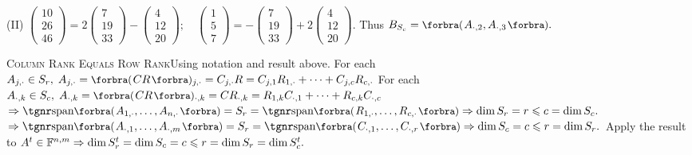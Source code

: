 (II) {\normalsize$\begin{pmatrix} 10\\[-2pt] 26\\[-2pt] 46\end{pmatrix}=2\begin{pmatrix} 7\\[-2pt] 19\\[-2pt] 33\end{pmatrix}-\begin{pmatrix} 4\\[-2pt] 12\\[-2pt] 20\end{pmatrix}; \quad \begin{pmatrix} 1\\[-2pt] 5\\[-2pt] 7\end{pmatrix}=-\begin{pmatrix} 7\\[-2pt] 19\\[-2pt] 33\end{pmatrix}+2\begin{pmatrix} 4\\[-2pt] 12\\[-2pt] 20\end{pmatrix}$}. \;Thus $B_{S_c}=\BigPar{A_{\cdot,2},A_{\cdot,3}}.$\vspace{6pt}\par
\SepLine

\BulletPointX\textsc{Column Rank Equals Row Rank}\quad Using notation and result above.\TextB{}
For each $A_{j,\cdot}\in S_r,\;A_{j,\cdot}=\BigPar{CR}{_{j,\cdot}}=C_{j,\cdot}R=C_{j,1}R_{1,\cdot}+\dots+C_{j,c}R_{c,\cdot}$\TextB{}
For each $A_{\cdot,k}\in S_c,\;A_{\cdot,k}=\BigPar{CR}{_{\cdot,k}}=CR_{\cdot,k}=R_{1,k}C_{\cdot,1}+\dots+R_{c,k}C_{\cdot,c}$\TextB{}
$\Rightarrow\Span[\BigPar]{A_{1,\cdot},\dots,A_{n,\cdot}}=S_r=\Span[\BigPar]{R_{1,\cdot},\dots,R_{c,\cdot}}\Rightarrow\dim S_r=r\leqslant c=\dim S_c.$\TextB{}
$\Rightarrow\Span[\BigPar]{A_{\cdot,1},\dots,A_{\cdot,m}}=S_r=\Span[\BigPar]{C_{\cdot,1},\dots,C_{\cdot,r}}\Rightarrow\dim S_c=c\leqslant r=\dim S_r.$\TextB{}
\Or Apply the result to $A^t\in{\mathbb{F}}^{n,m}\Rightarrow\dim S_r^t=\dim S_c=c\leqslant r=\dim S_r=\dim S_c^t.$\PfEnd
\SepLine

\def\rank{{\textup{\tgnr rank}}\,}

